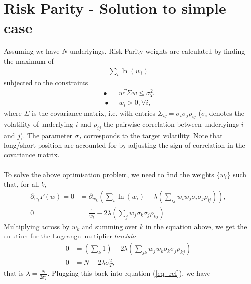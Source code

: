 \documentclass[10pt]{article}
\begin{document}
\section{Risk Parity - Solution to simple case}
Assuming we have $N$ underlyings. Risk-Parity weights are calculated by finding the maximum of
\begin{align}
\sum_i\ln(w_i)
\end{align}
subjected to the constraints
\begin{align}
\bullet\ \ \  & w^T\Sigma w \leq \sigma^2_T\\\
\bullet\ \ \ & w_i > 0, \forall i,
\end{align}
where $\Sigma$ is the covariance matrix, i.e. with entries $\Sigma_{ij} = \sigma_i\sigma_j\rho_{ij}$ ($\sigma_i$ denotes the volatility of underlying $i$ and $\rho_{ij}$ the pairwise correlation between underlyings $i$ and $j$). The parameter $\sigma_T$ corresponds to the target volatility. Note that long/short position are accounted for by adjusting the sign of correlation in the covariance matrix.\\ \\
To solve the above optimisation problem, we need to find the weights $\{w_i\}$ such that, for all $k$,
\begin{align}
\partial_{w_k}F(w) = 0 &= \partial_{w_k}\left(\sum_i\ln(w_i) - \lambda\left(\sum_{ij}w_iw_j\sigma_i\sigma_j\rho_{ij}\right)\right), \\
0 &=\frac{1}{w_k}  - 2\lambda\left(\sum_{j}w_j\sigma_k\sigma_j\rho_{kj}\right)\label{eq_ref}
\end{align}
Multiplying across by $w_k$ and summing over $k$ in the equation above, we get the solution for the Lagrange multiplier $lambda$
\begin{align}
0 &=\left(\sum_k 1\right)  - 2\lambda\left(\sum_{jk}w_jw_k\sigma_k\sigma_j\rho_{kj}\right)\\
0 &= N - 2\lambda\sigma^2_T,
\end{align}
that is $\lambda = \frac{N}{2\sigma^2_T}$. Plugging this back into equation (\ref{eq_ref}), we have
\end{document}
